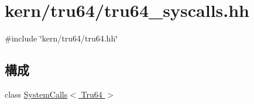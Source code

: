 \hypertarget{tru64__syscalls_8hh}{
\section{kern/tru64/tru64\_\-syscalls.hh}
\label{tru64__syscalls_8hh}
}
{\ttfamily \#include \char`\"{}kern/tru64/tru64.hh\char`\"{}}\par
\subsection*{構成}
\begin{DoxyCompactItemize}
\item 
class \hyperlink{classSystemCalls_3_01Tru64_01_4}{SystemCalls$<$ Tru64 $>$}
\end{DoxyCompactItemize}

